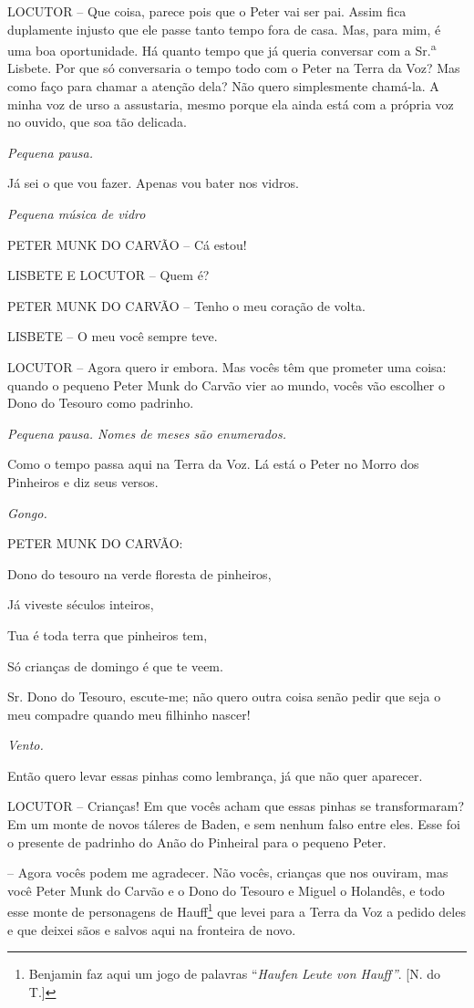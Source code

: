LOCUTOR -- Que coisa, parece pois que o Peter vai ser pai. Assim fica
duplamente injusto que ele passe tanto tempo fora de casa. Mas, para
mim, é uma boa oportunidade. Há quanto tempo que já queria conversar com
a Sr.\textsuperscript{a} Lisbete. Por que só conversaria o tempo todo
com o Peter na Terra da Voz? Mas como faço para chamar a atenção dela?
Não quero simplesmente chamá-la. A minha voz de urso a assustaria, mesmo
porque ela ainda está com a própria voz no ouvido, que soa tão delicada.

\emph{Pequena pausa.}

Já sei o que vou fazer. Apenas vou bater nos vidros.

\emph{Pequena música de vidro}

PETER MUNK DO CARVÃO -- Cá estou!

LISBETE E LOCUTOR -- Quem é?

PETER MUNK DO CARVÃO -- Tenho o meu coração de volta.

LISBETE -- O meu você sempre teve.

LOCUTOR -- Agora quero ir embora. Mas vocês têm que prometer uma coisa:
quando o pequeno Peter Munk do Carvão vier ao mundo, vocês vão escolher
o Dono do Tesouro como padrinho.

\emph{Pequena pausa. Nomes de meses são enumerados.}

Como o tempo passa aqui na Terra da Voz. Lá está o Peter no Morro dos
Pinheiros e diz seus versos.

\emph{Gongo.}

PETER MUNK DO CARVÃO:

Dono do tesouro na verde floresta de pinheiros,

Já viveste séculos inteiros,

Tua é toda terra que pinheiros tem,

Só crianças de domingo é que te veem.

Sr. Dono do Tesouro, escute-me; não quero outra coisa senão pedir que
seja o meu compadre quando meu filhinho nascer!

\emph{Vento.}

Então quero levar essas pinhas como lembrança, já que não quer aparecer.

LOCUTOR -- Crianças! Em que vocês acham que essas pinhas se
transformaram? Em um monte de novos táleres de Baden, e sem nenhum falso
entre eles. Esse foi o presente de padrinho do Anão do Pinheiral para o
pequeno Peter.

-- Agora vocês podem me agradecer. Não vocês, crianças que nos ouviram,
mas você Peter Munk do Carvão e o Dono do Tesouro e Miguel o Holandês, e
todo esse monte de personagens de Hauff\footnote{Benjamin faz aqui um
  jogo de palavras ``\emph{Haufen} \emph{Leute von Hauff''}. {[}N. do
  T.{]}} que levei para a Terra da Voz a pedido deles e que deixei sãos
e salvos aqui na fronteira de novo.


